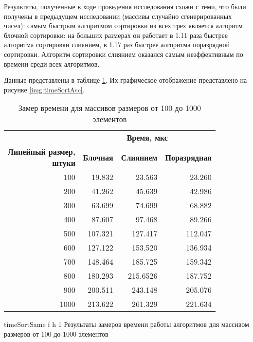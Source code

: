 Результаты, полученные в ходе проведения исследования схожи с теми, что были получены в предыдущем исследовании (массивы случайно сгенерированных чисел):
самым быстрым алгоритмом сортировки из всех трех является алгоритм блочной сортировки: на больших размерах он работает в 1.11 раза быстрее алгоритма сортировки слиянием, в 1.17 раз быстрее алгоритма поразрядной сортировки. Алгоритм сортировки слиянием оказался самым неэффективным по времени среди всех алгоритмов.

Данные представлены в таблице \ref{tbl:timeSame}. Их графическое отображение представлено на рисунке \ref{img:timeSortAsc}.

\begin{table}[ht]
	\small
	\begin{center}
		\begin{threeparttable}
			\caption{Замер времени для массивов размеров от 100 до 1000 элементов}
			\label{tbl:timeSame}
			\begin{tabular}{|r|r|r|r|}
				\hline
				& \multicolumn{3}{c|}{\bfseries Время, мкс} \\ \cline{2-4}
				\bfseries \makecell{Линейный размер, \\ штуки} & \bfseries Блочная & \bfseries Слиянием & \bfseries Поразрядная \\ \cline{2-4}
				\hline
				100 & 19.832 & 23.563 & 23.260 \\
				\hline
				200 & 41.262 & 45.639 & 42.986 \\
				\hline
				300 & 63.699 & 74.699 & 68.882 \\
				\hline
				400 & 87.607 & 97.468 & 89.266 \\
				\hline
				500 & 107.321 & 127.417 & 112.047 \\
				\hline
				600 & 127.122 & 153.520 & 136.934 \\
				\hline
				700 & 148.464 & 185.725 & 159.342 \\
				\hline
				800 & 180.293 & 215.6526 & 187.752 \\
				\hline
				900 & 200.511 & 243.148 & 205.076 \\
				\hline
				1000 & 213.622 & 261.329 & 221.634 \\
				\hline
			\end{tabular}	
		\end{threeparttable}
	\end{center}
\end{table}

{timeSortSame} %
{f} %
{h} %
{1\textwidth} %
{Результаты замеров времени работы алгоритмов для массивом размеров от 100 до 1000 элементов} %

